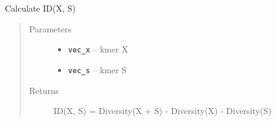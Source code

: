 \documentclass[letterpaper,10pt,english]{sphinxmanual}
\begin{document}
\begin{fulllineitems}
\label{reference/PyDNAnacutil:PyDNAnacutil.IdXS}
Calculate ID(X, S)
\begin{quote}\begin{description}
\item[{Parameters}] \leavevmode\begin{itemize}
\item {} 
\textbf{\texttt{vec\_x}} -- kmer X

\item {} 
\textbf{\texttt{vec\_s}} -- kmer S

\end{itemize}

\item[{Returns}] \leavevmode
ID(X, S) = Diversity(X + S) - Diversity(X) - Diversity(S)

\end{description}\end{quote}

\end{fulllineitems}


\begin{fulllineitems}
\label{reference/PyDNAnacutil:PyDNAnacutil.MakeIndex}
\end{fulllineitems}


\begin{fulllineitems}
\label{reference/PyDNAnacutil:PyDNAnacutil.MakeIndexUptoK}
\end{fulllineitems}


\begin{fulllineitems}
\label{reference/PyDNAnacutil:PyDNAnacutil.MakeIndexUptoKRevcomp}
\end{fulllineitems}

\end{document}

